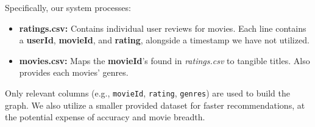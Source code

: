 \documentclass[12pt]{article}
\begin{document}
Specifically, our system processes:
\begin{itemize}
    \item \textbf{ratings.csv:} Contains individual user reviews for movies. Each line contains a \textbf{userId}, \textbf{movieId}, and \textbf{rating}, alongside a timestamp we have not utilized.
    \item \textbf{movies.csv:} Maps the \textbf{movieId}'s found in \textit{ratings.csv} to tangible titles. Also provides each movies' genres.
\end{itemize}

Only relevant columns (e.g., \texttt{movieId}, \texttt{rating}, \texttt{genres}) are used to build the graph. We also utilize a smaller provided dataset for faster recommendations, at the potential expense of accuracy and movie breadth.
\end{document}
